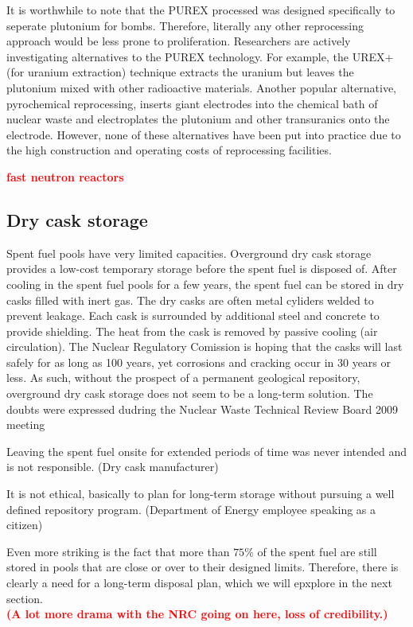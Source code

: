 \documentclass[preprint,aip,pra]{revtex4-1}
\newcommand{\red}[1]{\textcolor{red}{\bf #1}}
\begin{document}
    It is worthwhile to note that the PUREX processed was designed specifically to seperate plutonium for
    bombs. Therefore, literally any other reprocessing approach would be less prone to proliferation.
    Researchers are actively investigating alternatives to the PUREX technology. For example, the UREX+ (for
    uranium extraction) technique extracts the uranium but leaves the plutonium mixed with other
    radioactive materials. Another popular alternative, pyrochemical reprocessing, inserts giant electrodes
    into the chemical bath of nuclear waste and electroplates the plutonium and other transuranics onto
    the electrode. However, none of these alternatives have been put into practice due to the high construction
    and operating costs of reprocessing facilities.\cite{aa12}

    \red{fast neutron reactors}

    \subsection{Dry cask storage}
    Spent fuel pools have very limited capacities. 
    Overground dry cask storage provides a low-cost temporary storage before the spent fuel is disposed of.
    After cooling in the spent fuel pools for a few
    years, the spent fuel can be stored in dry casks filled with inert gas. 
    The dry casks are often metal cyliders welded to prevent leakage. Each cask is surrounded by
    additional steel and concrete to provide shielding.
    The heat from the cask is removed by passive
    cooling (air circulation). The Nuclear Regulatory Comission is hoping that the casks will
    last safely for as long as 100 years, yet corrosions and cracking occur in 30 years
    or less.\cite{aa12} As such, without the prospect of a permanent geological repository,
    overground dry cask storage does not seem to be a long-term solution. The doubts were expressed
    dudring  the Nuclear Waste Technical Review Board 2009 meeting \cite{nwtb09, aa12}
    \begin{displayquote}
    Leaving the spent fuel onsite for extended periods of time was never intended and is not
    responsible. (Dry cask manufacturer)

    It is not ethical, basically to plan for long-term storage without pursuing a well defined repository
    program. (Department of Energy employee speaking as a citizen)
    \end{displayquote}
    Even more striking is the fact that more than $75\%$ of the spent fuel are still stored in pools
    that are close or over to their designed limits.\cite{a11,aa12}
    Therefore, there is clearly a need for a long-term disposal plan, which we will epxplore in
    the next section.\\
    \red{(A lot more drama with the NRC going on here, loss of credibility.)}
\end{document}
